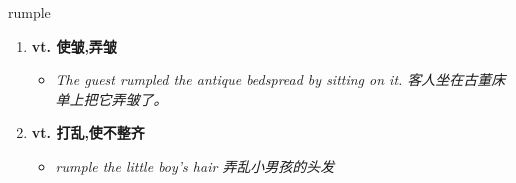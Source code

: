 
\begin{frame}
{\huge rumple}
\begin{center}
\begin{enumerate}\Large
  \item \textbf{vt. 使皱,弄皱}
  \begin{itemize}
    \item \em{\Large{The guest rumpled the antique bedspread by sitting on it. 客人坐在古董床单上把它弄皱了。}}
  \end{itemize}
  \item \textbf{vt. 打乱,使不整齐}
  \begin{itemize}
    \item \em{\Large{rumple the little boy's hair 弄乱小男孩的头发}}
  \end{itemize}
\end{enumerate}
\end{center}
\end{frame}
